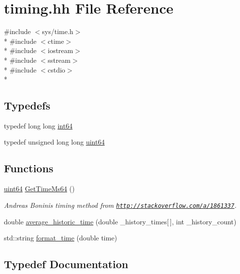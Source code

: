 \hypertarget{timing_8hh}{}\section{timing.\+hh File Reference}
\label{timing_8hh}
{\ttfamily \#include $<$sys/time.\+h$>$}\\*
{\ttfamily \#include $<$ctime$>$}\\*
{\ttfamily \#include $<$iostream$>$}\\*
{\ttfamily \#include $<$sstream$>$}\\*
{\ttfamily \#include $<$cstdio$>$}\\*
\subsection*{Typedefs}
\begin{DoxyCompactItemize}
\item 
typedef long long \hyperlink{timing_8hh_aecfc3c54bd29ad5964e1c1c3ccbf89df}{int64}
\item 
typedef unsigned long long \hyperlink{timing_8hh_a29940ae63ec06c9998bba873e25407ad}{uint64}
\end{DoxyCompactItemize}
\subsection*{Functions}
\begin{DoxyCompactItemize}
\item 
\hyperlink{timing_8hh_a29940ae63ec06c9998bba873e25407ad}{uint64} \hyperlink{timing_8hh_a80d549c116a695a963ad5b7d193fb33e}{Get\+Time\+Ms64} ()
\begin{DoxyCompactList}\small\item\em Andreas Bonini\textquotesingle{}s timing method from \href{http://stackoverflow.com/a/1861337}{\tt http\+://stackoverflow.\+com/a/1861337}. \end{DoxyCompactList}\item 
double \hyperlink{timing_8hh_a6b7ae6f9ca0b1d58941a5a7bd5b70554}{average\+\_\+historic\+\_\+time} (double \+\_\+history\+\_\+times\mbox{[}$\,$\mbox{]}, int \+\_\+history\+\_\+count)
\item 
std\+::string \hyperlink{timing_8hh_aab459cac7ed4df8d570398f7cd204574}{format\+\_\+time} (double time)
\end{DoxyCompactItemize}


\subsection{Typedef Documentation}
